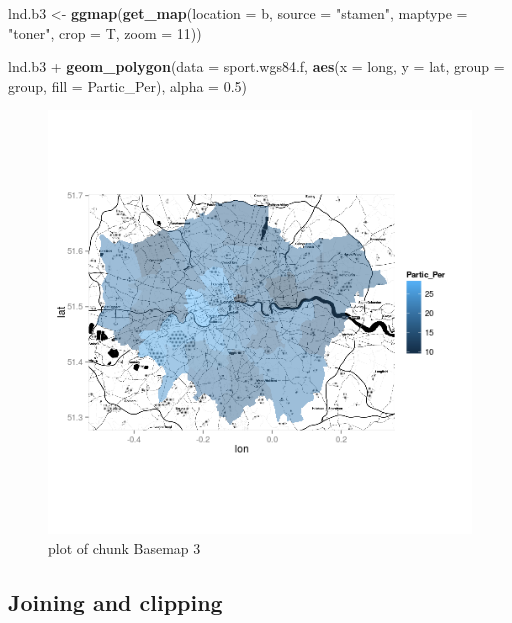 \documentclass[]{article}
\makeatletter
\newenvironment{Shaded}{}{}
\newcommand{\KeywordTok}[1]{\textcolor[rgb]{0.00,0.44,0.13}{\textbf{{#1}}}}
\newcommand{\DataTypeTok}[1]{\textcolor[rgb]{0.56,0.13,0.00}{{#1}}}
\newcommand{\DecValTok}[1]{\textcolor[rgb]{0.25,0.63,0.44}{{#1}}}
\newcommand{\FloatTok}[1]{\textcolor[rgb]{0.25,0.63,0.44}{{#1}}}
\newcommand{\StringTok}[1]{\textcolor[rgb]{0.25,0.44,0.63}{{#1}}}
\newcommand{\NormalTok}[1]{{#1}}
\def\maxwidth{\ifdim\Gin@nat@width>\linewidth\linewidth
\else\Gin@nat@width\fi}
\let\Oldincludegraphics\includegraphics
\renewcommand{\includegraphics}[1]{\Oldincludegraphics[width=\maxwidth]{#1}}
\makeatother
\begin{document}
\begin{Shaded}
\begin{Highlighting}[]
\NormalTok{lnd.b3 <- }\KeywordTok{ggmap}\NormalTok{(}\KeywordTok{get_map}\NormalTok{(}\DataTypeTok{location =} \NormalTok{b, }\DataTypeTok{source =} \StringTok{"stamen"}\NormalTok{, }\DataTypeTok{maptype =} \StringTok{"toner"}\NormalTok{, }
    \DataTypeTok{crop =} \NormalTok{T, }\DataTypeTok{zoom =} \DecValTok{11}\NormalTok{))}

\NormalTok{lnd.b3 + }\KeywordTok{geom_polygon}\NormalTok{(}\DataTypeTok{data =} \NormalTok{sport.wgs84.f, }\KeywordTok{aes}\NormalTok{(}\DataTypeTok{x =} \NormalTok{long, }\DataTypeTok{y =} \NormalTok{lat, }\DataTypeTok{group =} \NormalTok{group, }
    \DataTypeTok{fill =} \NormalTok{Partic_Per), }\DataTypeTok{alpha =} \FloatTok{0.5}\NormalTok{)}
\end{Highlighting}
\end{Shaded}
\begin{figure}[htbp]
\centering
\includegraphics{figure/Basemap_3.png}
\caption{plot of chunk Basemap 3}
\end{figure}

\subsection{Joining and clipping}
\end{document}

